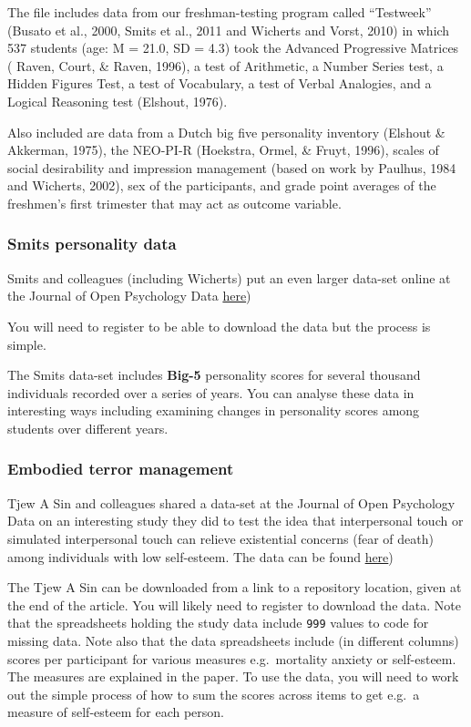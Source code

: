 \documentclass[
  letterpaper,
  DIV=11,
  numbers=noendperiod]{scrreprt}
\begin{document}
The file includes data from our freshman-testing program called
``Testweek'' (Busato et al., 2000, Smits et al., 2011 and Wicherts and
Vorst, 2010) in which 537 students (age: M = 21.0, SD = 4.3) took the
Advanced Progressive Matrices ( Raven, Court, \& Raven, 1996), a test of
Arithmetic, a Number Series test, a Hidden Figures Test, a test of
Vocabulary, a test of Verbal Analogies, and a Logical Reasoning test
(Elshout, 1976).

Also included are data from a Dutch big five personality inventory
(Elshout \& Akkerman, 1975), the NEO-PI-R (Hoekstra, Ormel, \& Fruyt,
1996), scales of social desirability and impression management (based on
work by Paulhus, 1984 and Wicherts, 2002), sex of the participants, and
grade point averages of the freshmen's first trimester that may act as
outcome variable.

\hypertarget{sec-how-smits}{%
\subsubsection{Smits personality data}\label{sec-how-smits}}

Smits and colleagues (including Wicherts) put an even larger data-set
online at the Journal of Open Psychology Data
\href{http://openpsychologydata.metajnl.com/articles/10.5334/jopd.e2/}{here})

You will need to register to be able to download the data but the
process is simple.

The Smits data-set includes \textbf{Big-5} personality scores for
several thousand individuals recorded over a series of years. You can
analyse these data in interesting ways including examining changes in
personality scores among students over different years.

\hypertarget{sec-how-embodied}{%
\subsubsection{Embodied terror management}\label{sec-how-embodied}}

Tjew A Sin and colleagues shared a data-set at the Journal of Open
Psychology Data on an interesting study they did to test the idea that
interpersonal touch or simulated interpersonal touch can relieve
existential concerns (fear of death) among individuals with low
self-esteem. The data can be found
\href{http://openpsychologydata.metajnl.com/articles/10.5334/jopd.ah/}{here})

The Tjew A Sin can be downloaded from a link to a repository location,
given at the end of the article. You will likely need to register to
download the data. Note that the spreadsheets holding the study data
include \texttt{999} values to code for missing data. Note also that the
data spreadsheets include (in different columns) scores per participant
for various measures e.g.~mortality anxiety or self-esteem. The measures
are explained in the paper. To use the data, you will need to work out
the simple process of how to sum the scores across items to get e.g.~a
measure of self-esteem for each person.
\end{document}

